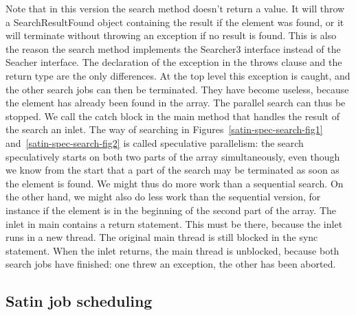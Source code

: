 \documentclass[10pt]{article}
\newcommand{\mysubsection}[1]{\subsection{#1}\label{#1}}
\begin{document}
Note that in this version the search method doesn't return a value. It
will throw a SearchResultFound object containing the result if the
element was found, or it will terminate without throwing an exception
if no result is found. This is also the reason the search method
implements the Searcher3 interface instead of the Seacher
interface. The declaration of the exception in the throws clause and
the return type are the only differences.  At the top level this
exception is caught, and the other search jobs can then be
terminated. They have become useless, because the element has already
been found in the array. The parallel search can thus be stopped. We
call the catch block in the main method that handles the result of the
search an inlet.  The way of searching in Figures~\ref{satin-spec-search-fig1} and~\ref{satin-spec-search-fig2} is called
speculative parallelism: the search speculatively starts on both two
parts of the array simultaneously, even though we know from the start
that a part of the search may be terminated as soon as the element is
found. We might thus do more work than a sequential search. On the
other hand, we might also do less work than the sequential version,
for instance if the element is in the beginning of the second part of
the array.  The inlet in main contains a return statement. This must
be there, because the inlet runs in a new thread. The original main
thread is still blocked in the sync statement. When the inlet returns,
the main thread is unblocked, because both search jobs have finished:
one threw an exception, the other has been aborted.  

\mysubsection{Satin job scheduling}
\end{document}
